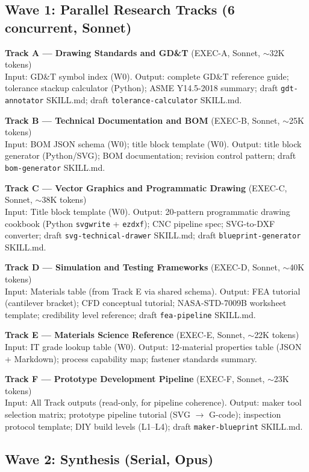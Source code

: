 \documentclass[11pt,letterpaper]{article}
\begin{document}
\subsection{Wave 1: Parallel Research Tracks (6 concurrent, Sonnet)}

\textbf{Track A --- Drawing Standards and GD\&T} (EXEC-A, Sonnet, $\sim$32K tokens)\\
Input: GD\&T symbol index (W0). Output: complete GD\&T reference guide; tolerance stackup calculator (Python); ASME Y14.5-2018 summary; draft \texttt{gdt-annotator} SKILL.md; draft \texttt{tolerance-calculator} SKILL.md.

\textbf{Track B --- Technical Documentation and BOM} (EXEC-B, Sonnet, $\sim$25K tokens)\\
Input: BOM JSON schema (W0); title block template (W0). Output: title block generator (Python/SVG); BOM documentation; revision control pattern; draft \texttt{bom-generator} SKILL.md.

\textbf{Track C --- Vector Graphics and Programmatic Drawing} (EXEC-C, Sonnet, $\sim$38K tokens)\\
Input: Title block template (W0). Output: 20-pattern programmatic drawing cookbook (Python \texttt{svgwrite} + \texttt{ezdxf}); CNC pipeline spec; SVG-to-DXF converter; draft \texttt{svg-technical-drawer} SKILL.md; draft \texttt{blueprint-generator} SKILL.md.

\textbf{Track D --- Simulation and Testing Frameworks} (EXEC-D, Sonnet, $\sim$40K tokens)\\
Input: Materials table (from Track E via shared schema). Output: FEA tutorial (cantilever bracket); CFD conceptual tutorial; NASA-STD-7009B worksheet template; credibility level reference; draft \texttt{fea-pipeline} SKILL.md.

\textbf{Track E --- Materials Science Reference} (EXEC-E, Sonnet, $\sim$22K tokens)\\
Input: IT grade lookup table (W0). Output: 12-material properties table (JSON + Markdown); process capability map; fastener standards summary.

\textbf{Track F --- Prototype Development Pipeline} (EXEC-F, Sonnet, $\sim$23K tokens)\\
Input: All Track outputs (read-only, for pipeline coherence). Output: maker tool selection matrix; prototype pipeline tutorial (SVG $\to$ G-code); inspection protocol template; DIY build levels (L1--L4); draft \texttt{maker-blueprint} SKILL.md.

\subsection{Wave 2: Synthesis (Serial, Opus)}
\end{document}

